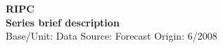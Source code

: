 \documentclass[a4paper,10pt]{article}
\begin{document}
\thispagestyle{empty}
\begin{landscape}
\begin{center}

\textbf{RIPC} \\ 

\textbf{Series brief description} \\ 

Base/Unit: 
\space \space \space Data Source:  
\space \space \space Forecast Origin: 6/2008 \\ 
\end{center}

\begin{footnotesize} \singlespacing  \end{footnotesize} 

\end{landscape}
\end{document}

